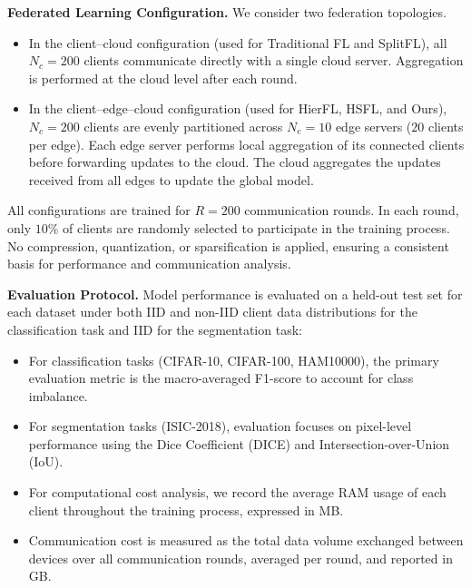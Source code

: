 \documentclass[letterpaper]{article} %
\begin{document}
    \noindent\textbf{Federated Learning Configuration.} We consider two federation topologies.
    \begin{itemize}
        \item In the client–cloud configuration (used for Traditional FL and SplitFL), all $N_c = 200$ clients communicate directly with a single cloud server. Aggregation is performed at the cloud level after each round.
        \item In the client–edge–cloud configuration (used for HierFL, HSFL, and Ours), $N_c = 200$ clients are evenly partitioned across $N_e = 10$ edge servers ($20$ clients per edge). Each edge server performs local aggregation of its connected clients before forwarding updates to the cloud. The cloud aggregates the updates received from all edges to update the global model.
    \end{itemize} 
    All configurations are trained for $R = 200$ communication rounds. In each round, only $10\%$ of clients are randomly selected to participate in the training process. No compression, quantization, or sparsification is applied, ensuring a consistent basis for performance and communication analysis.

    \noindent\textbf{Evaluation Protocol.} Model performance is evaluated on a held-out test set for each dataset under both IID and non-IID client data distributions for the classification task and IID for the segmentation task:
        \begin{itemize}
            \item For classification tasks (CIFAR-10, CIFAR-100, HAM10000), the primary evaluation metric is the macro-averaged F1-score to account for class imbalance. 
            \item For segmentation tasks (ISIC-2018), evaluation focuses on pixel-level performance using the Dice Coefficient (DICE) and Intersection-over-Union (IoU).
            \item For computational cost analysis, we record the average RAM usage of each client throughout the training process, expressed in MB. 
            \item Communication cost is measured as the total data volume exchanged between devices over all communication rounds, averaged per round, and reported in GB.
        \end{itemize}
\end{document}
